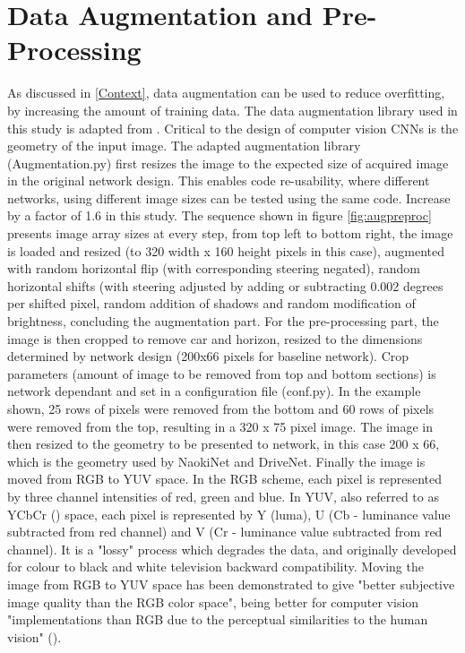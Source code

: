 \section{Data Augmentation and Pre-Processing}
\label{met:data-aug-pre-proc}
As discussed in \ref{Context}, data augmentation can be used to reduce overfitting, by increasing the amount of training data. The data augmentation library used in this study is adapted from \cite{Naoki2016}. Critical to the design of computer vision CNNs is the geometry of the input image. The adapted augmentation library (Augmentation.py) first resizes the image to the expected size of acquired image in the original network design. This enables code re-usability, where different networks, using different image sizes can be tested using the same code. 
Increase by a factor of 1.6 in this study.
The sequence shown in figure \ref{fig:augpreproc} presents image array sizes at every step, from top left to bottom right, the image is loaded and resized (to 320 width x 160 height pixels in this case), augmented with random horizontal flip (with corresponding steering negated), random horizontal shifts (with steering adjusted by adding or subtracting 0.002 degrees per shifted pixel, random addition of shadows and random modification of brightness, concluding the augmentation part.
For the pre-processing part, the image is then cropped to remove car and horizon, resized to the dimensions determined by network design (200x66 pixels for baseline network). Crop parameters (amount of image to be removed from top and bottom sections) is network dependant and set in a configuration file (conf.py). In the example shown, 25 rows of pixels were removed from the bottom and 60 rows of pixels were removed from the top, resulting in a 320 x 75 pixel image. The image in then resized to the geometry to be presented to network, in this case 200 x 66, which is the geometry used by NaokiNet and DriveNet. Finally the image is moved from RGB to YUV space. In the RGB scheme, each pixel is represented by three channel intensities of red, green and blue. In YUV, also referred to as YCbCr (\cite{maller2020}) space, each pixel is represented by Y (luma), U (Cb - luminance value subtracted from red channel) and V (Cr - luminance value subtracted from red channel). It is a "lossy" process which degrades the data, and originally developed for colour to black and white television backward compatibility. Moving the image from RGB to YUV space has been demonstrated to give "better subjective image quality than the RGB color space", being better for computer vision "implementations than RGB due to the perceptual similarities to the human vision" (\cite{podpora2014yuv}).

